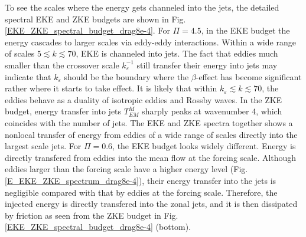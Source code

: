 \documentclass{ametsoc}
\begin{document}
To see the scales where the energy gets channeled into the jets, the
detailed spectral EKE and ZKE budgets are shown in Fig. \ref{EKE_ZKE_spectral_budget_drag8e-4}.
For $\Pi=4.5$, in the EKE budget the energy cascades to larger scales
via eddy-eddy interactions. Within a wide range of scales $5\apprle k\apprle70$,
EKE is channeled into jets. The fact that eddies much smaller
than the crossover scale $k_{\varepsilon}^{-1}$ still transfer their
energy into jets may indicate that $k_{\varepsilon}$ should
be the boundary where the $\beta$-effect has become significant rather where it
starts to take effect. It is likely that within $k_{\varepsilon}\apprle k\apprle70$,
the eddies behave as a duality of isotropic eddies and Rossby waves.
In the ZKE budget, energy transfer into jets $T_{EM}^{M}$ sharply
peaks at wavenumber 4, which coincides with the number of jets. The
EKE and ZKE spectra together shows a nonlocal transfer of energy from
eddies of a wide range of scales directly into the largest scale jets.
For $\Pi=0.6$, the EKE budget looks widely different. Energy is directly
transfered from eddies into the mean flow at the forcing scale. Although
eddies larger than the forcing scale have a higher energy level (Fig.
\ref{E_EKE_ZKE_spectrum_drag8e-4}), their energy transfer into the
jets is negligible compared with that by eddies at the forcing scale.
Therefore, the injected energy is directly transfered into the zonal
jets, and it is then dissipated by friction as seen from the ZKE budget
in Fig. \ref{EKE_ZKE_spectral_budget_drag8e-4} (bottom). 
\end{document}
